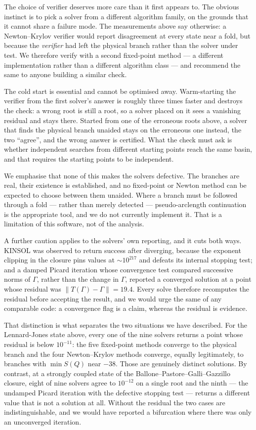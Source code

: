 \documentclass[11pt,a4paper]{article}
\begin{document}
The choice of verifier deserves more care than it first appears to. The
obvious instinct is to pick a solver from a different algorithm family, on
the grounds that it cannot share a failure mode. The measurements above say
otherwise: a Newton--Krylov verifier would report disagreement at every state
near a fold, but because the \emph{verifier} had left the physical branch
rather than the solver under test. We therefore verify with a second
fixed-point method --- a different implementation rather than a different
algorithm class --- and recommend the same to anyone building a similar
check.

The cold start is essential and cannot be optimised away. Warm-starting the
verifier from the first solver's answer is roughly three times faster and
destroys the check: a wrong root is still a root, so a solver placed on it
sees a vanishing residual and stays there. Started from one of the erroneous
roots above, a solver that finds the physical branch unaided stays on the
erroneous one instead, the two ``agree'', and the wrong answer is certified.
What the check must ask is whether independent searches from different
starting points reach the same basin, and that requires the starting points
to be independent.

We emphasise that none of this makes the solvers defective. The branches are
real, their existence is established, and no fixed-point or Newton method can
be expected to choose between them unaided. Where a branch must be followed
through a fold --- rather than merely detected --- pseudo-arclength
continuation is the appropriate tool, and we do not currently implement it.
That is a limitation of this software, not of the analysis.

A further caution applies to the solvers' own reporting, and it cuts both
ways. KINSOL was observed to return success after diverging, because the
exponent clipping in the closure pins values at $\sim10^{217}$ and defeats
its internal stopping test; and a damped Picard iteration whose convergence
test compared successive norms of $\Gamma$, rather than the change in
$\Gamma$, reported a converged solution at a point whose residual was
$\|T(\Gamma)-\Gamma\| = 19.4$. Every solve therefore recomputes the residual
before accepting the result, and we would urge the same of any comparable
code: a convergence flag is a claim, whereas the residual is evidence.

That distinction is what separates the two situations we have described. For
the Lennard-Jones state above, every one of the nine solvers returns a point
whose residual is below $10^{-11}$: the five fixed-point methods converge to
the physical branch and the four Newton--Krylov methods converge, equally
legitimately, to branches with $\min S(Q)$ near $-38$. Those are genuinely
distinct solutions. By contrast, at a strongly coupled state of the
Ballone--Pastore--Galli--Gazzillo closure, eight of nine solvers agree to
$10^{-12}$ on a single root and the ninth --- the undamped Picard iteration
with the defective stopping test --- returns a different value that is not a
solution at all. Without the residual the two cases are indistinguishable,
and we would have reported a bifurcation where there was only an
unconverged iteration.
\end{document}
